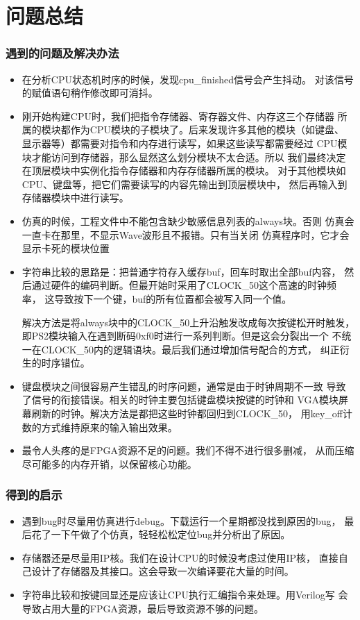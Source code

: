 \documentclass[12pt,a4paper,UTF8]{article}
\begin{document}
\newpage

\part{问题总结}
\section{遇到的问题及解决办法}
\begin{itemize}
  \item 在分析CPU状态机时序的时候，发现cpu\_finished信号会产生抖动。
        对该信号的赋值语句稍作修改即可消抖。
  \item 刚开始构建CPU时，我们把指令存储器、寄存器文件、内存这三个存储器
        所属的模块都作为CPU模块的子模块了。后来发现许多其他的模块（如键盘、
        显示器等）都需要对指令和内存进行读写，如果这些读写都需要经过
        CPU模块才能访问到存储器，那么显然这么划分模块不太合适。所以
        我们最终决定在顶层模块中实例化指令存储器和内存存储器所属的模块。
        对于其他模块如CPU、键盘等，把它们需要读写的内容先输出到顶层模块中，
        然后再输入到存储器模块中进行读写。
  \item 仿真的时候，工程文件中不能包含缺少敏感信息列表的always块。否则
        仿真会一直卡在那里，不显示Wave波形且不报错。只有当关闭
        仿真程序时，它才会显示卡死的模块位置
  \item 字符串比较的思路是：把普通字符存入缓存buf，回车时取出全部buf内容，
        然后通过硬件的编码判断。但最开始时采用了CLOCK\_50这个高速的时钟频率，
        这导致按下一个键，buf的所有位置都会被写入同一个值。

        解决方法是将always块中的CLOCK\_50上升沿触发改成每次按键松开时触发，
        即PS2模块输入在遇到断码0xf0时进行一系列判断。但是这会分裂出一个
        不统一在CLOCK\_50内的逻辑语块。最后我们通过增加信号配合的方式，
        纠正衍生的时序错位。
  \item 键盘模块之间很容易产生错乱的时序问题，通常是由于时钟周期不一致
        导致了信号的衔接错误。相关的时钟主要包括键盘模块按键的时钟和
        VGA模块屏幕刷新的时钟。解决方法是都把这些时钟都回归到CLOCK\_50，
        用key\_off计数的方式维持原来的输入输出效果。
  \item 最令人头疼的是FPGA资源不足的问题。我们不得不进行很多删减，
        从而压缩尽可能多的内存开销，以保留核心功能。
\end{itemize}

\section{得到的启示}
\begin{itemize}
  \item 遇到bug时尽量用仿真进行debug。下载运行一个星期都没找到原因的bug，
        最后花了一下午做了个仿真，轻轻松松定位bug并分析出了原因。
  \item 存储器还是尽量用IP核。我们在设计CPU的时候没考虑过使用IP核，
        直接自己设计了存储器及其接口。这会导致一次编译要花大量的时间。
  \item 字符串比较和按键回显还是应该让CPU执行汇编指令来处理。用Verilog写
        会导致占用大量的FPGA资源，最后导致资源不够的问题。
\end{itemize}
\end{document}
